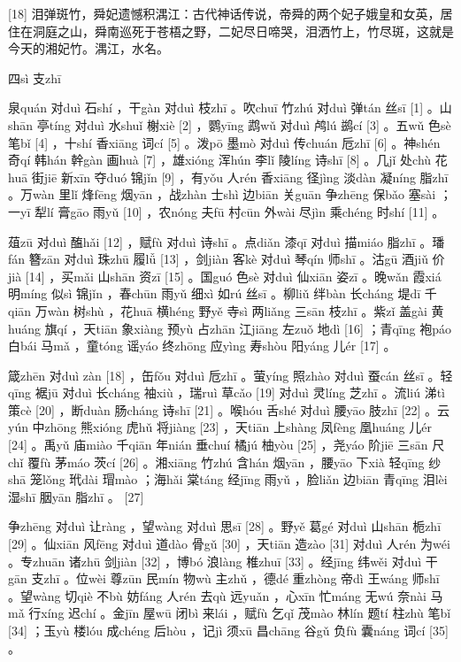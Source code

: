 \documentclass[12pt,UTF8]{ctexbook}
\begin{document}
[18] 泪弹斑竹，舜妃遗憾积湡江：古代神话传说，帝舜的两个妃子娥皇和女英，居住在洞庭之山，舜南巡死于苍梧之野，二妃尽日啼哭，泪洒竹上，竹尽斑，这就是今天的湘妃竹。湡江，水名。





四sì 支zhī


泉quán 对duì 石shí ，干gàn 对duì 枝zhī 。吹chuī 竹zhú 对duì 弹tán 丝sī [1] 。山shān 亭tíng 对duì 水shuǐ 榭xiè [2] ，鹦yīng 鹉wǔ 对duì 鸬lú 鹚cí [3] 。五wǔ 色sè 笔bǐ [4] ，十shí 香xiāng 词cí [5] 。泼pō 墨mò 对duì 传chuán 卮zhī [6] 。神shén 奇qí 韩hán 幹gàn 画huà [7] ，雄xióng 浑hún 李lǐ 陵líng 诗shī [8] 。几jǐ 处chù 花huā 街jiē 新xīn 夺duó 锦jǐn [9] ，有yǒu 人rén 香xiāng 径jìng 淡dàn 凝níng 脂zhī 。万wàn 里lǐ 烽fēng 烟yān ，战zhàn 士shì 边biān 关guān 争zhēng 保bǎo 塞sài ；一yī 犁lí 膏gāo 雨yǔ [10] ，农nóng 夫fū 村cūn 外wài 尽jìn 乘chéng 时shí [11] 。

葅zū 对duì 醢hǎi [12] ，赋fù 对duì 诗shī 。点diǎn 漆qī 对duì 描miáo 脂zhī 。璠fán 簪zān 对duì 珠zhū 履lǚ [13] ，剑jiàn 客kè 对duì 琴qín 师shī 。沽gū 酒jiǔ 价jià [14] ，买mǎi 山shān 资zī [15] 。国guó 色sè 对duì 仙xiān 姿zī 。晚wǎn 霞xiá 明míng 似sì 锦jǐn ，春chūn 雨yǔ 细xì 如rú 丝sī 。柳liǔ 绊bàn 长cháng 堤dī 千qiān 万wàn 树shù ，花huā 横héng 野yě 寺sì 两liǎng 三sān 枝zhī 。紫zǐ 盖gài 黄huáng 旗qí ，天tiān 象xiàng 预yù 占zhān 江jiāng 左zuǒ 地dì [16] ；青qīng 袍páo 白bái 马mǎ ，童tóng 谣yáo 终zhōng 应yìng 寿shòu 阳yáng 儿ér [17] 。

箴zhēn 对duì zàn [18] ，缶fǒu 对duì 卮zhī 。萤yíng 照zhào 对duì 蚕cán 丝sī 。轻qīng 裾jū 对duì 长cháng 袖xiù ，瑞ruì 草cǎo [19] 对duì 灵líng 芝zhī 。流liú 涕tì 策cè [20] ，断duàn 肠cháng 诗shī [21] 。喉hóu 舌shé 对duì 腰yāo 肢zhī [22] 。云yún 中zhōng 熊xióng 虎hǔ 将jiàng [23] ，天tiān 上shàng 凤fèng 凰huáng 儿ér [24] 。禹yǔ 庙miào 千qiān 年nián 垂chuí 橘jú 柚yòu [25] ，尧yáo 阶jiē 三sān 尺chǐ 覆fù 茅máo 茨cí [26] 。湘xiāng 竹zhú 含hán 烟yān ，腰yāo 下xià 轻qīng 纱shā 笼lǒng 玳dài 瑁mào ；海hǎi 棠táng 经jīng 雨yǔ ，脸liǎn 边biān 青qīng 泪lèi 湿shī 胭yān 脂zhī 。 [27]

争zhēng 对duì 让ràng ，望wàng 对duì 思sī [28] 。野yě 葛gé 对duì 山shān 栀zhī [29] 。仙xiān 风fēng 对duì 道dào 骨gǔ [30] ，天tiān 造zào [31] 对duì 人rén 为wéi 。专zhuān 诸zhū 剑jiàn [32] ，博bó 浪làng 椎zhuī [33] 。经jīng 纬wěi 对duì 干gān 支zhī 。位wèi 尊zūn 民mín 物wù 主zhǔ ，德dé 重zhòng 帝dì 王wáng 师shī 。望wàng 切qiè 不bù 妨fáng 人rén 去qù 远yuǎn ，心xīn 忙máng 无wú 奈nài 马mǎ 行xíng 迟chí 。金jīn 屋wū 闭bì 来lái ，赋fù 乞qǐ 茂mào 林lín 题tí 柱zhù 笔bǐ [34] ；玉yù 楼lóu 成chéng 后hòu ，记jì 须xū 昌chāng 谷gǔ 负fù 囊náng 词cí [35] 。
\end{document}
